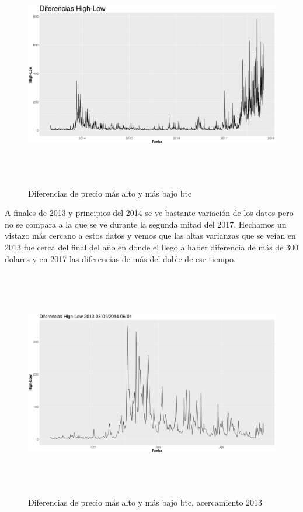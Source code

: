 \documentclass[12pt,letterpaper]{article}
\begin{document}
    \begin{figure}
        \centering

        \includegraphics[width = 18cm, height = 10cm]{btc/diferencias_BTC_HighLow}

        \caption{Diferencias de precio m\'as alto y m\'as bajo btc}
    \end{figure}

    A finales de 2013 y principios del 2014 se ve bastante variaci\'on de los datos pero no se compara a la que se ve durante la segunda mitad del 2017. Hechamos un vistazo m\'as cercano a estos datos y vemos que las altas varianzas que se ve\'ian en 2013 fue cerca del final del a\~no en donde el llego a haber diferencia de m\'as de 300 dolares y en 2017 las diferencias de m\'as del doble de ese tiempo.

    \begin{figure}
        \centering

        \includegraphics[width = 18cm, height = 10cm]{btc/diferencias_BTC_HighLow_1}

        \caption{Diferencias de precio m\'as alto y m\'as bajo btc, acercamiento 2013}
    \end{figure}
\end{document}
